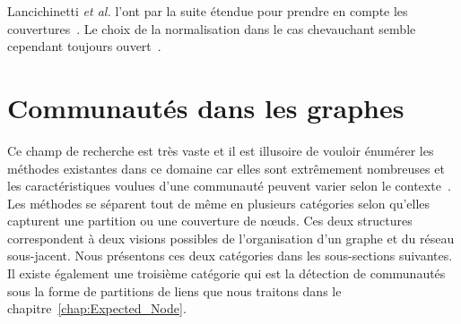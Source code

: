 Lancichinetti \emph{et al.} l'ont par la suite étendue pour prendre en compte les couvertures~\cite{Lancichinetti2009d}.
Le choix de la normalisation dans le cas chevauchant semble cependant toujours ouvert~\cite{McDaid2011,Zhang2015c}.



\section{Communautés dans les graphes}
\label{sec:intro_communaute}

Ce champ de recherche est très vaste et il est illusoire de vouloir énumérer les méthodes existantes dans ce domaine car elles sont extrêmement nombreuses et les caractéristiques voulues d'une communauté peuvent varier selon le contexte~\cite{Leskovec2008,Coscia2011,Yang2015,Jeub2015}.
Les méthodes se séparent tout de même en plusieurs catégories selon qu'elles capturent une partition ou une couverture de n\oe{}uds.
Ces deux structures correspondent à deux visions possibles de l'organisation d'un graphe et du réseau sous-jacent.
Nous présentons ces deux catégories dans les sous-sections suivantes.
Il existe également une troisième catégorie qui est la détection de communautés sous la forme de partitions de liens que nous traitons dans le chapitre~\ref{chap:Expected_Node}.

